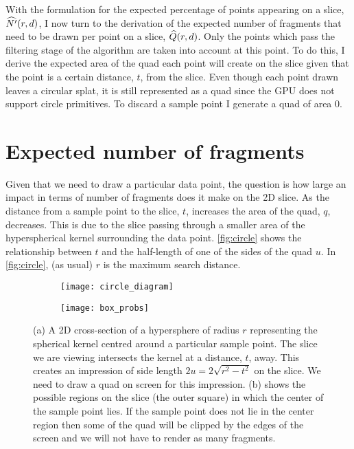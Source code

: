 

With the formulation for the expected percentage of points appearing on a
slice, $\widehat{N'}(r, d)$, I now turn to the derivation of the expected
number of fragments that need to be drawn per point on a slice, 
$\widehat{Q}(r,d)$. Only the points which pass the filtering stage of the algorithm
are taken into account at this point. 
To do this,
I derive the expected area of 
the quad each point will create on the slice given that the point is a certain
distance, $t$, from the slice. Even though each point drawn
leaves a circular splat, it is still represented as a quad since the GPU
does not support circle primitives. To discard a sample point I generate a
quad of area $0$.

\section{Expected number of fragments}

Given that we need to draw a particular data point, the question is how large
an impact in terms of number of fragments does it make on the 2D slice. As the
distance from a sample point to the slice, $t$, increases the area of the 
quad, $q$, decreases. This is due to the slice passing through a smaller area 
of the
hyperspherical kernel surrounding the data point. \autoref{fig:circle} shows the
relationship between $t$ and the half-length of one of the sides of the 
quad $u$.  In \autoref{fig:circle}, (as usual) $r$ is the maximum search distance.

\begin{figure}[htb]
\centering
\begin{subfigure}{0.4\textwidth}
  \texttt{[image: circle\_diagram]}
  \caption{
  }
  \label{fig:circle}
\end{subfigure}%
\begin{subfigure}{0.4\textwidth}
  \texttt{[image: box\_probs]}
  \caption{
  }
  \label{fig:quad_size}
\end{subfigure}
\caption[Kernel/slice interaction]{%
  (a) A 2D cross-section of a hypersphere of radius $r$ representing 
  the spherical kernel 
  centred around a particular sample point.  The slice we are
  viewing intersects the kernel at a distance, $t$, away.  This 
  creates an impression of side length $2u = 2\sqrt{r^2-t^2}$ on the 
  slice.  We need to draw a quad on screen for this impression.
  (b) shows the possible regions on the slice (the outer square)
  in which the center of the sample point lies.  If the sample point
  does not lie in the center region then some of the quad will be clipped
  by the edges of the screen and we will not have to render as many 
  fragments.
}
\label{fig:appendix_geom}
\end{figure}

